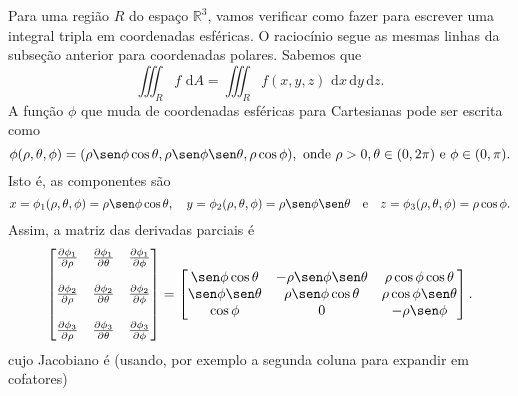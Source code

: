 Para uma região $R$ do espaço $\mathbb{R}^3$, vamos verificar como fazer para escrever uma integral tripla em coordenadas esféricas. O raciocínio segue as mesmas linhas da subseção anterior para coordenadas polares. Sabemos que
\begin{equation}
\iiint_R f \, \, \mathrm{d} A = \iiint_R f(x,y, z) \, \, \mathrm{d} x \, \mathrm{d} y  \, \mathrm{d} z.
\end{equation} A função $\phi$ que muda de coordenadas esféricas para Cartesianas pode ser escrita como
\begin{equation}
\phi (\rho, \theta, \phi) = (\rho \sen \phi \cos \theta, \rho \sen \phi \sen \theta, \rho \cos \phi), \text{ onde } \rho> 0, \theta \in (0,2\pi) \text{ e } \phi \in (0, \pi).
\end{equation} Isto é, as componentes são
\begin{equation}
x = \phi_1 (\rho, \theta, \phi) = \rho \sen \phi \cos \theta, \quad
y = \phi_2 (\rho, \theta, \phi) = \rho \sen \phi \sen \theta \quad \text{e} \quad
z = \phi_3 (\rho, \theta, \phi) = \rho \cos \phi.
\end{equation} Assim, a matriz das derivadas parciais é
\begin{equation}
\begin{bmatrix}
\frac{\partial \phi_1}{\partial \rho} & \frac{\partial \phi_1}{\partial \theta} & \frac{\partial \phi_1}{\partial \phi}  \\
& & \\
\frac{\partial \phi_2}{\partial \rho} & \frac{\partial \phi_2}{\partial \theta} & \frac{\partial \phi_2}{\partial \phi} \\
& & \\
\frac{\partial \phi_3}{\partial \rho} & \frac{\partial \phi_3}{\partial \theta} & \frac{\partial \phi_3}{\partial \phi}
\end{bmatrix} =
\begin{bmatrix}
\sen \phi \cos \theta & -\rho \sen \phi \sen \theta   & \rho \cos \phi \cos \theta \\
\sen \phi \sen \theta &  \rho \sen \phi \cos \theta   & \rho \cos \phi \sen \theta  \\
\cos \phi         &            0                  &    -\rho \sen \phi
\end{bmatrix}.
\end{equation} cujo Jacobiano é (usando, por exemplo a segunda coluna para expandir em cofatores)

